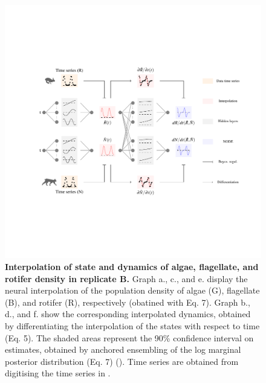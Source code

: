 \documentclass[11pt, oneside]{article}
\begin{document}
\begin{figure}[H]
\includegraphics[width=1\linewidth,page=13]{figures/main.pdf}
\caption{
    \textbf{Interpolation of state and dynamics of algae, flagellate, and rotifer density in replicate B.}
    Graph a., c., and e. display the neural interpolation of the population density of algae (G), flagellate (B), and rotifer (R), respectively (obatined with Eq. 7). 
    Graph b., d., and f. show the corresponding interpolated dynamics, obtained by differentiating the interpolation of the states with respect to time (Eq. 5).
    The shaded areas represent the 90\% confidence interval on estimates, obtained by anchored ensembling of the log marginal posterior distribution (Eq. 7) (\cite{Pearce2018}).
    Time series are obtained from digitising the time series in \cite{Hiltunen2013}.
}
\end{figure}
\newpage
\end{document}
